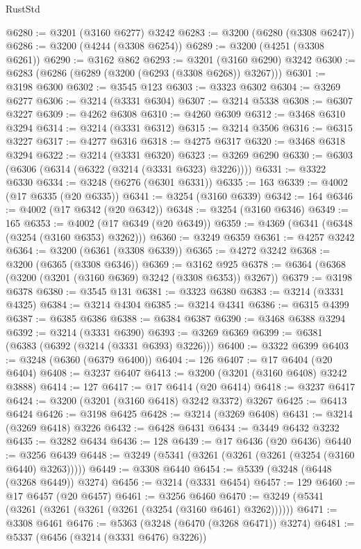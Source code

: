 \begin{lexlean}{RustStd}
\begin{coremodule}
@6280 := @3201 (@3160 @6277) @3242
@6283 := @3200 (@6280 (@3308 @6247))
@6286 := @3200 (@4244 (@3308 @6254))
@6289 := @3200 (@4251 (@3308 @6261))
@6290 := @3162 @862
@6293 := @3201 (@3160 @6290) @3242
@6300 := @6283 (@6286 (@6289 (@3200 (@6293 (@3308 @6268)) @3267)))
@6301 := @3198 @6300
@6302 := @3545 @123
@6303 := @3323 @6302
@6304 := @3269 @6277
@6306 := @3214 (@3331 @6304)
@6307 := @3214 @5338
@6308 := @6307 @3227
@6309 := @4262 @6308
@6310 := @4260 @6309
@6312 := @3468 @6310 @3294
@6314 := @3214 (@3331 @6312)
@6315 := @3214 @3506
@6316 := @6315 @3227
@6317 := @4277 @6316
@6318 := @4275 @6317
@6320 := @3468 @6318 @3294
@6322 := @3214 (@3331 @6320)
@6323 := @3269 @6290
@6330 := @6303 (@6306 (@6314 (@6322 (@3214 (@3331 @6323) @3226))))
@6331 := @3322 @6330
@6334 := @3248 (@6276 (@6301 @6331))
@6335 := 163
@6339 := @4002 (@17 @6335 (@20 @6335))
@6341 := @3254 (@3160 @6339)
@6342 := 164
@6346 := @4002 (@17 @6342 (@20 @6342))
@6348 := @3254 (@3160 @6346)
@6349 := 165
@6353 := @4002 (@17 @6349 (@20 @6349))
@6359 := @4369 (@6341 (@6348 (@3254 (@3160 @6353) @3262)))
@6360 := @3249 @6359
@6361 := @4257 @3242
@6364 := @3200 (@6361 (@3308 @6339))
@6365 := @4272 @3242
@6368 := @3200 (@6365 (@3308 @6346))
@6369 := @3162 @925
@6378 := @6364 (@6368 (@3200 (@3201 (@3160 @6369) @3242 (@3308 @6353)) @3267))
@6379 := @3198 @6378
@6380 := @3545 @131
@6381 := @3323 @6380
@6383 := @3214 (@3331 @4325)
@6384 := @3214 @4304
@6385 := @3214 @4341
@6386 := @6315 @4399
@6387 := @6385 @6386
@6388 := @6384 @6387
@6390 := @3468 @6388 @3294
@6392 := @3214 (@3331 @6390)
@6393 := @3269 @6369
@6399 := @6381 (@6383 (@6392 (@3214 (@3331 @6393) @3226)))
@6400 := @3322 @6399
@6403 := @3248 (@6360 (@6379 @6400))
@6404 := 126
@6407 := @17 @6404 (@20 @6404)
@6408 := @3237 @6407
@6413 := @3200 (@3201 (@3160 @6408) @3242 @3888)
@6414 := 127
@6417 := @17 @6414 (@20 @6414)
@6418 := @3237 @6417
@6424 := @3200 (@3201 (@3160 @6418) @3242 @3372) @3267
@6425 := @6413 @6424
@6426 := @3198 @6425
@6428 := @3214 (@3269 @6408)
@6431 := @3214 (@3269 @6418) @3226
@6432 := @6428 @6431
@6434 := @3449 @6432 @3232
@6435 := @3282 @6434
@6436 := 128
@6439 := @17 @6436 (@20 @6436)
@6440 := @3256 @6439
@6448 := @3249 (@5341 (@3261 (@3261 (@3261 (@3254 (@3160 @6440) @3263)))))
@6449 := @3308 @6440
@6454 := @5339 (@3248 (@6448 (@3268 @6449)) @3274)
@6456 := @3214 (@3331 @6454)
@6457 := 129
@6460 := @17 @6457 (@20 @6457)
@6461 := @3256 @6460
@6470 := @3249 (@5341 (@3261 (@3261 (@3261 (@3261 (@3254 (@3160 @6461) @3262))))))
@6471 := @3308 @6461
@6476 := @5363 (@3248 (@6470 (@3268 @6471)) @3274)
@6481 := @5337 (@6456 (@3214 (@3331 @6476) @3226))

\end{coremodule}
\end{lexlean}
